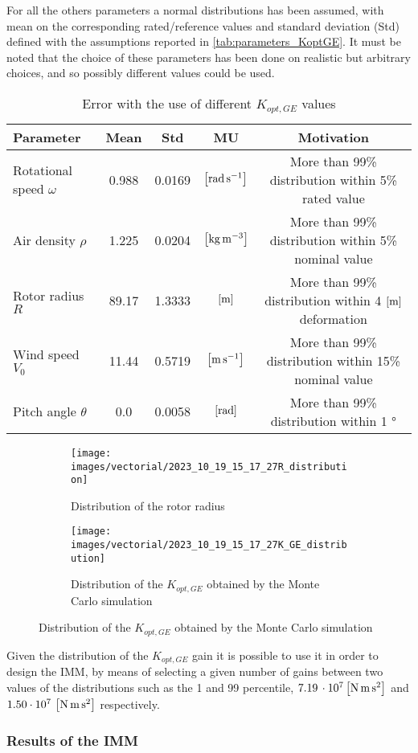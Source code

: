 For all the others parameters a normal distributions has been assumed, with mean on the corresponding rated/reference values and standard deviation (Std) defined with the assumptions reported in \autoref{tab:parameters_KoptGE}. It must be noted that the choice of these parameters has been done on realistic but arbitrary choices, and so possibly different values could be used.  

\begin{table}[htb]
  \centering
  \begin{tabular}{lcccc}
  \toprule
  Parameter & Mean & Std & MU & Motivation\\ \midrule
  Rotational speed $\omega$ & 0.988 & 0.0169 & $\left[\si{\radian\per\second}\right]$ & More than 99\% distribution within 5\% rated value\\
  Air density $\rho$ &  1.225 & 0.0204 & $\left[\si{\kilo\gram\per\cubic\meter}\right]$ & More than 99\% distribution within 5\% nominal value \\
  Rotor radius $R$  & 89.17 & 1.3333 & $\left[\si{\meter}\right]$ & More than 99\% distribution within 4 $\left[\si{\meter}\right]$ deformation \\
  Wind speed $V_0$  & 11.44 & 0.5719 & $\left[\si{\meter\per\second}\right]$ & More than 99\% distribution within 15\% nominal value \\
  Pitch angle $\theta$ & 0.0 & 0.0058 & $\left[\si{\radian}\right]$ & More than 99\% distribution within  1 $\si{\degree}$ \\
 \bottomrule
  \end{tabular}
  \caption{Error with the use of different $K_{opt,GE}$ values}
  \label{tab:parameters_KoptGE}
\end{table}

\begin{figure}[htb]
  \begin{subfigure}{0.5\columnwidth}
    \centering
    \texttt{[image: images/vectorial/2023\_10\_19\_15\_17\_27R\_distribution]}
    \caption{Distribution of the rotor radius}
    \label{fig:R_distribution}
  \end{subfigure}
  \begin{subfigure}{0.5\columnwidth}
    \centering
    \texttt{[image: images/vectorial/2023\_10\_19\_15\_17\_27K\_GE\_distribution]}
    \caption{Distribution of the $K_{opt,GE}$ obtained by the Monte Carlo simulation}
    \label{fig:K_GE_distribution}
  \end{subfigure}
\end{figure}

Given the distribution of the $K_{opt,GE}$ gain it is possible to use it in order to design the IMM, by means of selecting a given number of gains between two values of the distributions such as the 1 and 99 percentile, $7.19 \, \cdot 10^7 \left[\si{\newton \meter \square \second}\right]$ and $1.50 \cdot 10^7 \, \left[\si{\newton \meter \square \second}\right]$ respectively.

\subsubsection{Results of the IMM} 